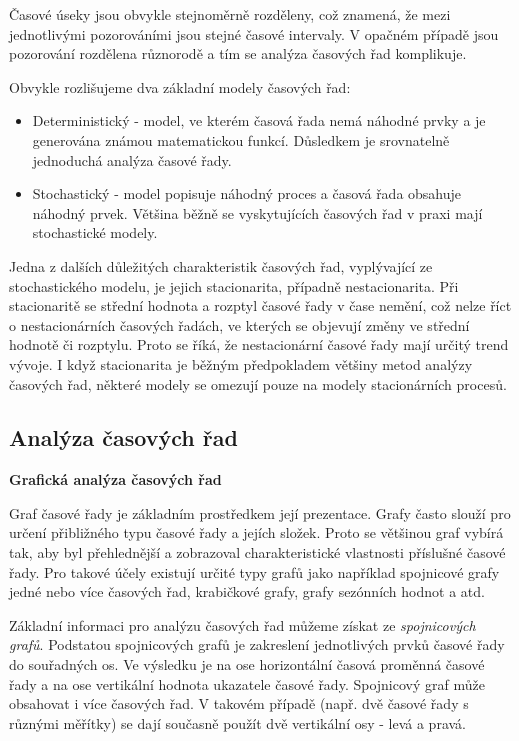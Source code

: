 \documentclass[a4paper,12pt,twoside]{scrreprt}
\begin{document}
Časové úseky jsou obvykle stejnoměrně rozděleny, což znamená, že mezi jednotlivými pozorováními jsou stejné časové intervaly. V opačném případě jsou pozorování rozdělena různorodě a tím se analýza časových řad komplikuje. 

\newpage

Obvykle rozlišujeme dva základní modely časových řad:
\begin{itemize}
\item Deterministický - model, ve kterém časová řada nemá náhodné prvky a je \\ generována známou matematickou funkcí. Důsledkem je srovnatelně jednoduchá analýza časové řady. 
\item Stochastický - model popisuje náhodný proces a časová řada obsahuje náhodný prvek. Většina běžně se vyskytujících časových řad v praxi mají stochastické modely.
\end{itemize}

Jedna z dalších důležitých charakteristik časových řad, vyplývající ze stochastického modelu, je jejich stacionarita, případně nestacionarita. Při stacionaritě se střední hodnota a rozptyl časové řady v čase nemění, což nelze říct o nestacionárních časových řadách, ve kterých se objevují změny ve střední hodnotě či rozptylu. Proto se říká, že nestacionární časové řady mají určitý trend vývoje. I když stacionarita je běžným předpokladem většiny metod analýzy časových řad, některé modely se omezují pouze na modely stacionárních procesů.  


\subsection{Analýza časových řad}
\normalsize \textbf{Grafická analýza časových řad}

Graf časové řady je základním prostředkem její prezentace. Grafy často slouží pro určení přibližného typu časové řady a jejích složek. Proto se většinou graf vybírá tak, aby byl přehlednější a zobrazoval charakteristické vlastnosti příslušné časové řady. Pro takové účely existují určité typy grafů jako například spojnicové grafy jedné nebo více časových řad, krabičkové grafy, grafy sezónních hodnot a atd. 

Základní informaci pro analýzu časových řad můžeme získat ze \textit{spojnicových grafů}. Podstatou spojnicových grafů je zakreslení jednotlivých prvků časové řady do souřadných os. Ve výsledku je na ose horizontální časová proměnná časové řady a na ose vertikální hodnota ukazatele časové řady. Spojnicový graf může obsahovat i více časových řad. V takovém případě (např. dvě časové řady s různými měřítky) se dají současně použít dvě vertikální osy - levá a pravá.
\end{document}
